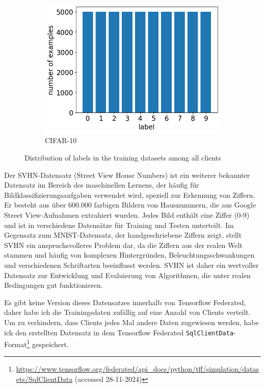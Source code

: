 \begin{figure}[tb]
\begin{subfigure}{0.32\textwidth}
		\includegraphics[width=\textwidth]{Bilder/cifar_label_distribution.png}
		\caption{CIFAR-10}
	\end{subfigure}
	\caption{Distribution of labels in the training datasets among all clients}
	\label{fig:label-distribution-all}
\end{figure}

Der SVHN-Datensatz (Street View House Numbers) ist ein weiterer bekannter Datensatz im Bereich des maschinellen Lernens, der häufig für Bildklassifizierungsaufgaben verwendet wird, speziell zur Erkennung von Ziffern. Er besteht aus über 600.000 farbigen Bildern von Hausnummern, die aus Google Street View-Aufnahmen extrahiert wurden. Jedes Bild enthält eine Ziffer (0-9) und ist in verschiedene Datensätze für Training und Testen unterteilt. Im Gegensatz zum MNIST-Datensatz, der handgeschriebene Ziffern zeigt, stellt SVHN ein anspruchsvolleres Problem dar, da die Ziffern aus der realen Welt stammen und häufig von komplexen Hintergründen, Beleuchtungsschwankungen und verschiedenen Schriftarten beeinflusst werden. SVHN ist daher ein wertvoller Datensatz zur Entwicklung und Evaluierung von Algorithmen, die unter realen Bedingungen gut funktionieren.

Es gibt keine Version dieses Datensatzes innerhalb von Tensorflow Federated, daher habe ich die Trainingsdaten zufällig auf eine Anzahl von Clients verteilt. Um zu verhindern, dass Clients jedes Mal andere Daten zugewiesen werden, habe ich den erstellten Datensatz in dem Tensorflow Federated \texttt{SqlClientData}-Format\footnote{\url{https://www.tensorflow.org/federated/api_docs/python/tff/simulation/datasets/SqlClientData} (accessed 28-11-2024)} gespeichert.

